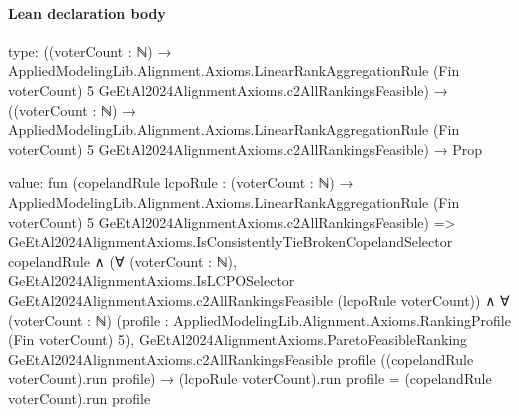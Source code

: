 \documentclass[10pt]{article}
\begin{document}
\paragraph{Lean declaration body}
\begin{ReviewVerbatim}
type:
((voterCount : ℕ) →
    AppliedModelingLib.Alignment.Axioms.LinearRankAggregationRule (Fin voterCount) 5
      GeEtAl2024AlignmentAxioms.c2AllRankingsFeasible) →
  ((voterCount : ℕ) →
      AppliedModelingLib.Alignment.Axioms.LinearRankAggregationRule (Fin voterCount) 5
        GeEtAl2024AlignmentAxioms.c2AllRankingsFeasible) →
    Prop

value:
fun
    (copelandRule lcpoRule :
      (voterCount : ℕ) →
        AppliedModelingLib.Alignment.Axioms.LinearRankAggregationRule (Fin voterCount) 5
          GeEtAl2024AlignmentAxioms.c2AllRankingsFeasible) =>
  GeEtAl2024AlignmentAxioms.IsConsistentlyTieBrokenCopelandSelector copelandRule ∧
    (∀ (voterCount : ℕ),
        GeEtAl2024AlignmentAxioms.IsLCPOSelector GeEtAl2024AlignmentAxioms.c2AllRankingsFeasible
          (lcpoRule voterCount)) ∧
      ∀ (voterCount : ℕ) (profile : AppliedModelingLib.Alignment.Axioms.RankingProfile (Fin voterCount) 5),
        GeEtAl2024AlignmentAxioms.ParetoFeasibleRanking GeEtAl2024AlignmentAxioms.c2AllRankingsFeasible profile
            ((copelandRule voterCount).run profile) →
          (lcpoRule voterCount).run profile = (copelandRule voterCount).run profile
\end{ReviewVerbatim}
\end{document}
